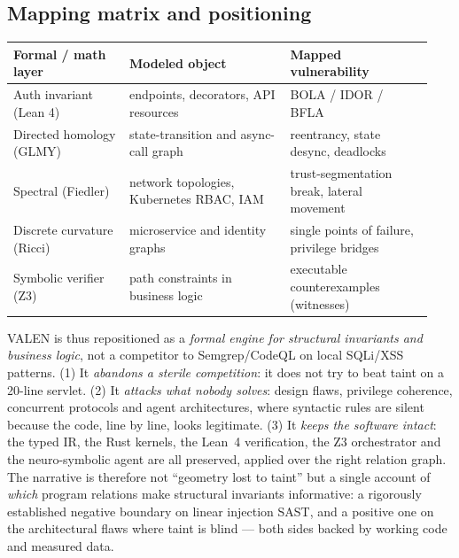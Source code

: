 \documentclass[11pt]{article}
\begin{document}
\subsection{Mapping matrix and positioning}
\begin{center}
\small
\begin{tabular}{@{}p{0.26\linewidth}p{0.36\linewidth}p{0.32\linewidth}@{}}
\toprule
\textbf{Formal / math layer} & \textbf{Modeled object} & \textbf{Mapped vulnerability} \\
\midrule
Auth invariant (Lean 4) & endpoints, decorators, API resources & BOLA / IDOR / BFLA \\
Directed homology (GLMY) & state-transition and async-call graph & reentrancy, state desync, deadlocks \\
Spectral (Fiedler) & network topologies, Kubernetes RBAC, IAM & trust-segmentation break, lateral movement \\
Discrete curvature (Ricci) & microservice and identity graphs & single points of failure, privilege bridges \\
Symbolic verifier (Z3) & path constraints in business logic & executable counterexamples (witnesses) \\
\bottomrule
\end{tabular}
\end{center}
VALEN is thus repositioned as a \emph{formal engine for structural invariants
and business logic}, not a competitor to Semgrep/CodeQL on local SQLi/XSS
patterns. (1) It \emph{abandons a sterile competition}: it does not try to beat
taint on a 20-line servlet. (2) It \emph{attacks what nobody solves}: design
flaws, privilege coherence, concurrent protocols and agent architectures, where
syntactic rules are silent because the code, line by line, looks legitimate.
(3) It \emph{keeps the software intact}: the typed IR, the Rust kernels, the
Lean~4 verification, the Z3 orchestrator and the neuro-symbolic agent are all
preserved, applied over the right relation graph. The narrative is therefore not
``geometry lost to taint'' but a single account of \emph{which} program relations
make structural invariants informative: a rigorously established negative
boundary on linear injection SAST, and a positive one on the architectural flaws
where taint is blind --- both sides backed by working code and measured data.
\end{document}
